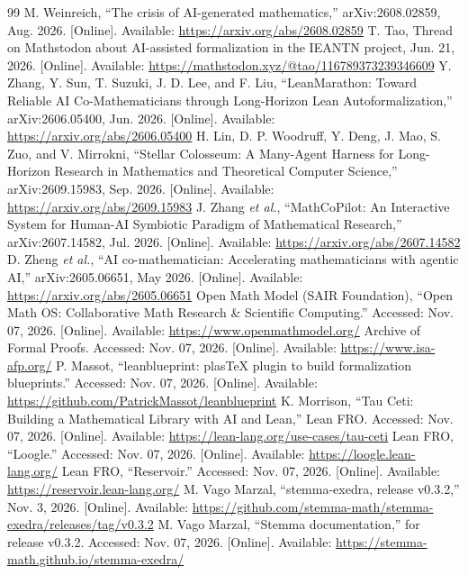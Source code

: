 \documentclass{article}
\begin{document}
\begin{thebibliography}{99}
 M. Weinreich, ``The crisis of AI-generated mathematics,'' arXiv:2608.02859, Aug. 2026. [Online]. Available: \url{https://arxiv.org/abs/2608.02859}
 T. Tao, Thread on Mathstodon about AI-assisted formalization in the IEANTN project, Jun. 21, 2026. [Online]. Available: \url{https://mathstodon.xyz/@tao/116789373239346609}
 Y. Zhang, Y. Sun, T. Suzuki, J. D. Lee, and F. Liu, ``LeanMarathon: Toward Reliable AI Co-Mathematicians through Long-Horizon Lean Autoformalization,'' arXiv:2606.05400, Jun. 2026. [Online]. Available: \url{https://arxiv.org/abs/2606.05400}
 H. Lin, D. P. Woodruff, Y. Deng, J. Mao, S. Zuo, and V. Mirrokni, ``Stellar Colosseum: A Many-Agent Harness for Long-Horizon Research in Mathematics and Theoretical Computer Science,'' arXiv:2609.15983, Sep. 2026. [Online]. Available: \url{https://arxiv.org/abs/2609.15983}
 J. Zhang \emph{et al.}, ``MathCoPilot: An Interactive System for Human-AI Symbiotic Paradigm of Mathematical Research,'' arXiv:2607.14582, Jul. 2026. [Online]. Available: \url{https://arxiv.org/abs/2607.14582}
 D. Zheng \emph{et al.}, ``AI co-mathematician: Accelerating mathematicians with agentic AI,'' arXiv:2605.06651, May 2026. [Online]. Available: \url{https://arxiv.org/abs/2605.06651}
 Open Math Model (SAIR Foundation), ``Open Math OS: Collaborative Math Research \& Scientific Computing.'' Accessed: Nov. 07, 2026. [Online]. Available: \url{https://www.openmathmodel.org/}
 Archive of Formal Proofs. Accessed: Nov. 07, 2026. [Online]. Available: \url{https://www.isa-afp.org/}
 P. Massot, ``leanblueprint: plasTeX plugin to build formalization blueprints.'' Accessed: Nov. 07, 2026. [Online]. Available: \url{https://github.com/PatrickMassot/leanblueprint}
 K. Morrison, ``Tau Ceti: Building a Mathematical Library with AI and Lean,'' Lean FRO. Accessed: Nov. 07, 2026. [Online]. Available: \url{https://lean-lang.org/use-cases/tau-ceti}
 Lean FRO, ``Loogle.'' Accessed: Nov. 07, 2026. [Online]. Available: \url{https://loogle.lean-lang.org/}
 Lean FRO, ``Reservoir.'' Accessed: Nov. 07, 2026. [Online]. Available: \url{https://reservoir.lean-lang.org/}
 M. Vago Marzal, ``stemma-exedra, release v0.3.2,'' Nov. 3, 2026. [Online]. Available: \url{https://github.com/stemma-math/stemma-exedra/releases/tag/v0.3.2}
 M. Vago Marzal, ``Stemma documentation,'' for release v0.3.2. Accessed: Nov. 07, 2026. [Online]. Available: \url{https://stemma-math.github.io/stemma-exedra/}
\end{thebibliography}
\end{document}
